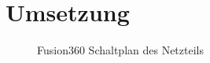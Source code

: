 \section{Umsetzung}
\label{sec:Netzteil_Umsetzung}

\begin{figure}[h]
\setlength{\fboxsep}{1pt} %
\setlength{\fboxrule}{1pt} %
\caption{Fusion360 Schaltplan des Netzteils}
\label{fig:Netzteil_Layout}
\end{figure}
\FloatBarrier